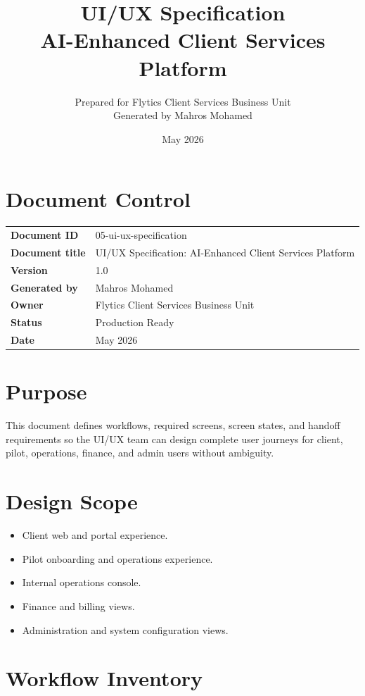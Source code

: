 \documentclass[11pt,a4paper]{article}
\title{\textbf{UI/UX Specification\\AI-Enhanced Client Services Platform}}
\author{Prepared for Flytics Client Services Business Unit\\Generated by Mahros Mohamed}
\date{May 2026}
\begin{document}
\maketitle
\section*{Document Control}
\begin{longtable}{>{\bfseries}p{}p{}}
\toprule
Document ID & 05-ui-ux-specification \\
Document title & UI/UX Specification: AI-Enhanced Client Services Platform \\
Version & 1.0 \\
Generated by & Mahros Mohamed \\
Owner & Flytics Client Services Business Unit \\
Status & Production Ready \\
Date & May 2026 \\
\bottomrule
\end{longtable}

\renewcommand{\contentsname}{Contents}
\tableofcontents
\newpage

\section*{Purpose}

This document defines workflows, required screens, screen states, and handoff requirements so the UI/UX team can design complete user journeys for client, pilot, operations, finance, and admin users without ambiguity.

\section{Design Scope}

\begin{itemize}[leftmargin=*]
    \item Client web and portal experience.
    \item Pilot onboarding and operations experience.
    \item Internal operations console.
    \item Finance and billing views.
    \item Administration and system configuration views.
\end{itemize}

\section{Workflow Inventory}
\end{document}
